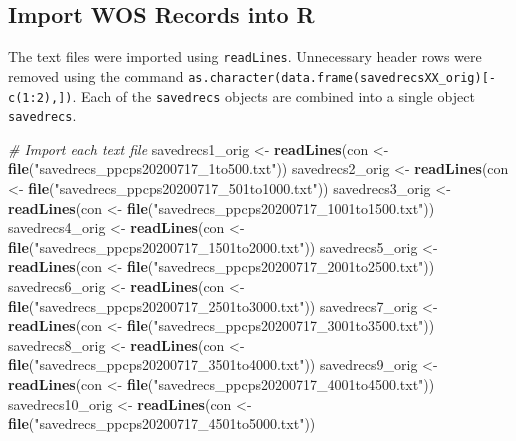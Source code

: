 \documentclass[
]{article}
\newenvironment{Shaded}{\begin{snugshade}}{\end{snugshade}}
\newcommand{\CommentTok}[1]{\textcolor[rgb]{0.56,0.35,0.01}{\textit{#1}}}
\newcommand{\KeywordTok}[1]{\textcolor[rgb]{0.13,0.29,0.53}{\textbf{#1}}}
\newcommand{\NormalTok}[1]{#1}
\newcommand{\StringTok}[1]{\textcolor[rgb]{0.31,0.60,0.02}{#1}}
\begin{document}
\hypertarget{import-wos-records-into-r}{%
\subsection{Import WOS Records into R}\label{import-wos-records-into-r}}

The text files were imported using \texttt{readLines}. Unnecessary
header rows were removed using the command
\texttt{as.character(data.frame(savedrecsXX\_orig){[}-c(1:2),{]})}. Each
of the \texttt{savedrecs} objects are combined into a single object
\texttt{savedrecs}.

\begin{Shaded}
\begin{Highlighting}[]
\CommentTok{# Import each text file}
\NormalTok{savedrecs1_orig <-}\StringTok{ }\KeywordTok{readLines}\NormalTok{(con <-}\StringTok{ }\KeywordTok{file}\NormalTok{(}\StringTok{"savedrecs_ppcps20200717_1to500.txt"}\NormalTok{))}
\NormalTok{savedrecs2_orig <-}\StringTok{ }\KeywordTok{readLines}\NormalTok{(con <-}\StringTok{ }\KeywordTok{file}\NormalTok{(}\StringTok{"savedrecs_ppcps20200717_501to1000.txt"}\NormalTok{))}
\NormalTok{savedrecs3_orig <-}\StringTok{ }\KeywordTok{readLines}\NormalTok{(con <-}\StringTok{ }\KeywordTok{file}\NormalTok{(}\StringTok{"savedrecs_ppcps20200717_1001to1500.txt"}\NormalTok{))}
\NormalTok{savedrecs4_orig <-}\StringTok{ }\KeywordTok{readLines}\NormalTok{(con <-}\StringTok{ }\KeywordTok{file}\NormalTok{(}\StringTok{"savedrecs_ppcps20200717_1501to2000.txt"}\NormalTok{))}
\NormalTok{savedrecs5_orig <-}\StringTok{ }\KeywordTok{readLines}\NormalTok{(con <-}\StringTok{ }\KeywordTok{file}\NormalTok{(}\StringTok{"savedrecs_ppcps20200717_2001to2500.txt"}\NormalTok{))}
\NormalTok{savedrecs6_orig <-}\StringTok{ }\KeywordTok{readLines}\NormalTok{(con <-}\StringTok{ }\KeywordTok{file}\NormalTok{(}\StringTok{"savedrecs_ppcps20200717_2501to3000.txt"}\NormalTok{))}
\NormalTok{savedrecs7_orig <-}\StringTok{ }\KeywordTok{readLines}\NormalTok{(con <-}\StringTok{ }\KeywordTok{file}\NormalTok{(}\StringTok{"savedrecs_ppcps20200717_3001to3500.txt"}\NormalTok{))}
\NormalTok{savedrecs8_orig <-}\StringTok{ }\KeywordTok{readLines}\NormalTok{(con <-}\StringTok{ }\KeywordTok{file}\NormalTok{(}\StringTok{"savedrecs_ppcps20200717_3501to4000.txt"}\NormalTok{))}
\NormalTok{savedrecs9_orig <-}\StringTok{ }\KeywordTok{readLines}\NormalTok{(con <-}\StringTok{ }\KeywordTok{file}\NormalTok{(}\StringTok{"savedrecs_ppcps20200717_4001to4500.txt"}\NormalTok{))}
\NormalTok{savedrecs10_orig <-}\StringTok{ }\KeywordTok{readLines}\NormalTok{(con <-}\StringTok{ }\KeywordTok{file}\NormalTok{(}\StringTok{"savedrecs_ppcps20200717_4501to5000.txt"}\NormalTok{))}

\end{Highlighting}
\end{Shaded}
\end{document}
